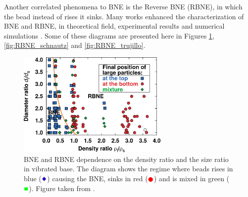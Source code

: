     Another correlated phenomena to BNE is the Reverse BNE (RBNE), in which the bead instead of rises it sinks. Many works enhanced the characterization of BNE and RBNE, in theoretical field, experimental results and numerical simulations \cite{A_Horizontal_Brazil-Nut_Effect_and_Its_Reverse, Brazil-nut_effect_versus_reverse_Brazil-nut_effect_in_a_moderately_dense_granular_fluid, Categorization_of_Brazil_nut_and_its_reverse_under_less-convective_conditions_for_microgravity_geology, Competition_of_Brazil_nut_effect_buoyancy_and_inelasticity_induced_segregation_in_a_granular_mixture, Reverse_Brazil_Nut_Problem_Competition_between_Percolation_and_Condensation, Reverse_buoyancy_in_a_vibrated_granular_bed_Computer_Simulations, Reversing_the_Brazil-Nut_Effect_Competition_between_Percolation_and_Condensation, Segregation_in_a_fluidized_binary_granular_mixture_Competition_between_buoyancy_and_geometric_forces, Simple_model_for_reverse_buoyancy_in_a_vibrated_granular_system, Hydrodynamic_theory_for_reverse_brazil_nut_segregation_and_the_non-monotonic_ascension_dynamics}. Some of these diagrams are presented here in Figures \ref{fig:RBNE_breu}, \ref{fig:RBNE_schnautz} and \ref{fig:RBNE_trujillo}.

\begin{figure}[H]
    \centering
    \includegraphics[width=0.65\textwidth]{04-figuras/BNE_Breu.png}
    \caption[Phase diagram of BNE/RBNE from experiment: density ratio and size ratio.]{BNE and RBNE dependence on the density ratio and the size ratio in vibrated base. The diagram shows the regime where beads rises in blue ($\textcolor{blue}{\Diamondblack}$) causing the BNE, sinks in red ($\textcolor{red}{\CIRCLE}$) and is mixed in green ($\textcolor{green}{\blacksquare}$). Figure taken from \cite{Reversing_the_Brazil-Nut_Effect_Competition_between_Percolation_and_Condensation}.}
    \label{fig:RBNE_breu}
\end{figure}

